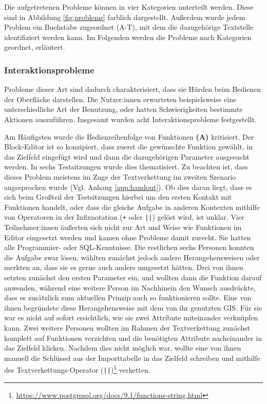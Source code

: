 Die aufgetretenen Probleme können in vier Kategorien unterteilt werden. Diese sind in Abbildung \ref{fig:problems} farblich dargestellt. Außerdem wurde jedem Problem ein Buchstabe zugeordnet (A-T), mit dem die dazugehörige Textstelle identifiziert werden kann. Im Folgenden werden die Probleme nach Kategorien geordnet, erläutert.

\subsubsection{Interaktionsprobleme}

Probleme dieser Art sind dadurch charakterisiert, dass sie Hürden beim Bedienen der Oberfläche darstellen. Die Nutzer:innen erwarteten beispielsweise eine unterschiedliche Art der Benutzung, oder hatten Schwierigkeiten bestimmte Aktionen auszuführen. Insgesamt wurden acht Interaktionsprobleme festgestellt.

Am Häufigsten wurde die Bedienreihenfolge von Funktionen \textbf{(A)} kritisiert. Der Block-Editor ist so konzipiert, dass zuerst die gewünschte Funktion gewählt, in das Zielfeld eingefügt wird und dann die dazugehörigen Parameter ausgesucht werden. In sechs Testsitzungen wurde dies thematisiert. Zu beachten ist, dass dieses Problem meistens im Zuge der Textverkettung im zweiten Szenario angesprochen wurde (Vgl. Anhang \ref{app:handout}). Ob dies daran liegt, dass es sich beim Großteil der Testsitzungen hierbei um den ersten Kontakt mit Funktionen handelt, oder dass die gleiche Aufgabe in anderen Kontexten mithilfe von Operatoren in der Infixnotation (\texttt{+} oder \texttt{||}) gelöst wird, ist unklar. Vier Teilnehmer:innen äußerten sich nicht zur Art und Weise wie Funktionen im Editor eingesetzt werden und kamen ohne Probleme damit zurecht. Sie hatten alle Programmier- oder \ac{SQL}-Kenntnisse. Die restlichen sechs Personen konnten die Aufgabe zwar lösen, wählten zunächst jedoch andere Herangehensweisen oder merkten an, dass sie es gerne auch anders umgesetzt hätten. Drei von ihnen setzten zunächst den ersten Parameter ein, und wollten dann die Funktion darauf anwenden, während eine weitere Person im Nachhinein den Wunsch ausdrückte, dass es zusätzlich zum aktuellen Prinzip auch so funktionieren sollte. Eine von ihnen begründete diese Herangehensweise mit dem von ihr genutzten \ac{GIS}. Für sie war es nicht auf sofort ersichtlich, wie sie zwei Attribute miteinander verknüpfen kann. Zwei weitere Personen wollten im Rahmen der Textverkettung zunächst komplett auf Funktionen verzichten und die benötigten Attribute nacheinander in das Zielfeld klicken. Nachdem dies nicht möglich war, wollte eine von ihnen manuell die Schlüssel aus der Importtabelle in das Zielfeld schreiben und mithilfe des Textverkettungs-Operator (\texttt{||})\footnote{\url{https://www.postgresql.org/docs/9.1/functions-string.html}} verketten.

